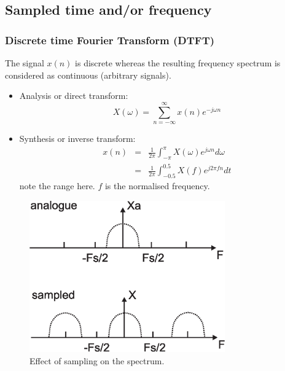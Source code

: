 \documentclass[12pt,a4paper]{article}
\begin{document}
\subsection{Sampled time and/or frequency}

\subsubsection{Discrete time Fourier Transform (DTFT)}

The signal $x(n)$ is discrete whereas the resulting frequency
spectrum is considered as continuous (arbitrary signals).

\begin{itemize}
\item Analysis or direct transform:
\begin{equation}
X(\omega)=\sum_{n=-\infty}^{\infty} x(n) e^{-j\omega n}
\end{equation}

\item Synthesis or inverse transform:
\begin{eqnarray}
x(n) & = & \frac{1}{2\pi} \int_{-\pi}^{\pi} X(\omega) e^{j\omega n} d\omega \\
     & = & \frac{1}{2\pi} \int_{-0.5}^{0.5} X(f) e^{j 2\pi f n} dt
\end{eqnarray}
note the range here. $f$ is the normalised frequency.

\end{itemize}


\begin{figure}[!hbt]
\begin{center}
\mbox{\includegraphics[width=0.75\textwidth]{periodic_ny}}
\end{center}
\caption{Effect of sampling on the spectrum.
\label{periodic_ny}}
\end{figure}
\end{document}
